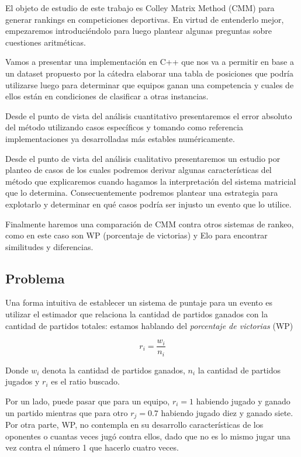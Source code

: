 El objeto de estudio de este trabajo es Colley Matrix Method (CMM) para generar rankings en competiciones deportivas. En virtud de entenderlo mejor, empezaremos introduciéndolo para luego plantear algunas preguntas sobre cuestiones aritméticas.

Vamos a presentar una implementación en C++ que nos va a permitir en base a un dataset propuesto por la cátedra elaborar una tabla de posiciones que podría utilizarse luego para determinar que equipos ganan una competencia y cuales de ellos están en condiciones de clasificar a otras instancias.

Desde el punto de vista del análisis cuantitativo presentaremos el error absoluto del método utilizando casos específicos y tomando como referencia implementaciones ya desarrolladas más estables numéricamente.

Desde el punto de vista del análisis cualitativo presentaremos un estudio por planteo de casos de los cuales podremos derivar algunas características del método que explicaremos cuando hagamos la interpretación del sistema matricial que lo determina. Consecuentemente podremos plantear una estrategia para explotarlo y determinar en qué casos podría ser injusto un evento que lo utilice.

Finalmente haremos una comparación de CMM contra otros sistemas de rankeo, como en este caso son WP (porcentaje de victorias) y Elo para encontrar similitudes y diferencias.

\subsection{Problema}
Una forma intuitiva de establecer un sistema de puntaje para un evento es utilizar el estimador que relaciona la cantidad de partidos ganados con la cantidad de partidos totales: estamos hablando del \textit{porcentaje de victorias} (WP)

\begin{equation}
    r_i = \frac{w_i}{n_i}
\end{equation}

Donde $w_i$ denota la cantidad de partidos ganados, $n_i$ la cantidad de partidos jugados y $r_i$ es el ratio buscado.

Por un lado, puede pasar que para un equipo, $r_i = 1$ habiendo jugado y ganado un partido mientras que para otro $r_j = 0.7$ habiendo jugado diez y ganado siete. Por otra parte, WP, no contempla en su desarrollo características de los oponentes o cuantas veces jugó contra ellos, dado que no es lo mismo jugar una vez contra el número 1 que hacerlo cuatro veces.

